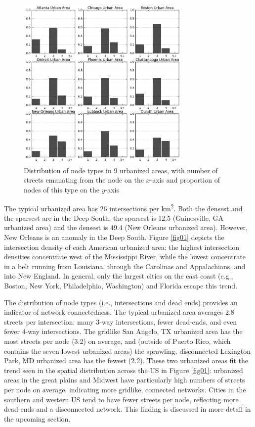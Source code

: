 \documentclass{article}
\begin{document}
\begin{figure}
\includegraphics[width=0.75\textwidth]{media/fig02.png}
\caption{Distribution of node types in 9 urbanized areas, with number of streets emanating from the node on the $x$-axis and proportion of nodes of this type on the $y$-axis }
\label{fig02}
\end{figure}

The typical urbanized area has 26 intersections per km\textsuperscript{2}. Both the densest and the sparsest are in the Deep South: the sparsest is 12.5 (Gainesville, GA urbanized area) and the densest is 49.4 (New Orleans urbanized area). However, New Orleans is an anomaly in the Deep South. Figure \ref{fig01} depicts the intersection density of each American urbanized area: the highest intersection densities concentrate west of the Mississippi River, while the lowest concentrate in a belt running from Louisiana, through the Carolinas and Appalachians, and into New England. In general, only the largest cities on the east coast (e.g., Boston, New York, Philadelphia, Washington) and Florida escape this trend.

The distribution of node types (i.e., intersections and dead ends) provides an indicator of network connectedness. The typical urbanized area averages 2.8 streets per intersection: many 3-way intersections, fewer dead-ends, and even fewer 4-way intersections. The gridlike San Angelo, TX urbanized area has the most streets per node (3.2) on average, and (outside of Puerto Rico, which contains the seven lowest urbanized areas) the sprawling, disconnected Lexington Park, MD urbanized area has the fewest (2.2). These two urbanized areas fit the trend seen in the spatial distribution across the US in Figure \ref{fig01}: urbanized areas in the great plains and Midwest have particularly high numbers of streets per node on average, indicating more gridlike, connected networks. Cities in the southern and western US tend to have fewer streets per node, reflecting more dead-ends and a disconnected network. This finding is discussed in more detail in the upcoming section.
\end{document}
